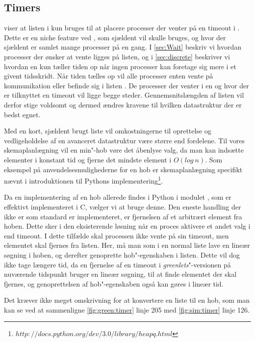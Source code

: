 \subsection{Timers}  
 viser at listen  i \pycsp kun bruges til at placere processer der venter på en timeout i . Dette er en niche feature ved \pycsp, som  sjældent vil skulle bruges, og hvor der sjældent er samlet mange processer på en gang. 
 I \cref{sec:Wait} beskriv vi hvordan processer der ønsker at vente ligges på  listen, og i \cref{sec:discrete} beskriver vi hvordan \sched en kun tæller tiden op når ingen processer kan foretage sig mere i et givent tidsskridt. Når tiden tælles op vil  alle processer enten vente på kommunikation eller befinde sig i listen . De processer der venter i en  og hvor der er tilknyttet en timeout vil ligge begge steder. Gennemsnitslængden af listen vil derfor stige voldsomt og dermed ændres kravene til hvilken  datastruktur der er bedst egnet. 
 
Med en kort, sjældent brugt liste vil omkostningerne til oprettelse og vedligeholdelse af en avanceret datastruktur være større end fordelene. Til vores skemaplanlægning  vil en min"-hob vøre det åbenlyse valg, da  man kan  indsætte elementer i konstant tid og fjerne det mindste element i $O(log\ n)$. Som eksempel på anvendelsesmulighederne for en hob er skemaplanlægning specifikt nævnt i introduktionen til Pythons implementering\footnote{$http://docs.python.org/dev/3.0/library/heapq.html$}.  

Da en implementering af en hob allerede findes i Python i modulet , som er effektivt implementeret i C, vælger vi at bruge denne. Den eneste handling
der ikke er som standard er implementeret, er fjernelsen af et arbitrært element fra hoben. Dette sker i den eksisterende løsning når en proces
aktivere et andet valg i  end timeout. I dette tilfælde skal
processen ikke vente på sin timeout, men elementet skal fjernes fra
 listen. Her, må man som i
en normal liste lave en lineær søgning i hoben, og derefter genoprette
hob"-egenskaben i listen. Dette vil dog ikke tage længere tid, da en fjernelse af en timeout i \emph{greenlets}"-versionen på nuværende
tidspunkt bruger en lineær søgning, til at finde elementet der skal
fjernes, og genoprettelsen af hob"-egenskaben også kan gøres i lineær tid.

Det kræver ikke meget omskrivning for at konvertere en liste til en hob, som man kan se ved at sammenligne \cref{fig:green:timer} linje 205 med \cref{fig:sim:timer} linje 126. 


